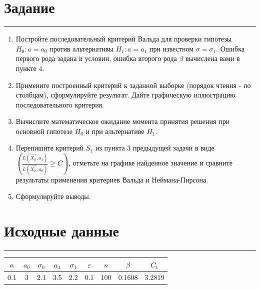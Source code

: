 \documentclass[a4paper, 14pt]{extarticle}
\begin{document}
\lstset{style=mystyle, extendedchars=\true}


\section*{Задание}\vspace{-20pt}\rule{\linewidth}{0.1mm}

\begin{enumerate}
    \item Постройте последовательный критерий Вальда для проверки гипотезы \( H_0: a = a_0 \) против альтернативы \( H_1: a = a_1 \) при известном \( \sigma = \sigma_1 \). Ошибка первого рода задана в условии, ошибка второго рода \( \beta \) вычислена вами в пункте 4.
    \item Примените построенный критерий к заданной выборке (порядок чтения - по столбцам), сформулируйте результат. Дайте графическую иллюстрацию последовательного критерия.
    \item Вычислите математическое ожидание момента принятия решения при основной гипотезе \( H_0 \) и при альтернативе \( H_1 \).
    \item Перепишите критерий \( S_1 \) из пункта 3 предыдущей задачи в виде \( \left( \frac{L(\vec{X_n}, a_1)}{L(\vec{X_n}, a_0)}  \geq C \right) \), отметьте на графике найденное значение и сравните результаты применения критериев Вальда и Неймана-Пирсона.
    \item Сформулируйте выводы.
\end{enumerate}

\section*{Исходные данные}\vspace{-20pt}\rule{\linewidth}{0.1mm}

\begin{center}
    \begin{tabular}{|c|c|c|c|c|c|c|c|c|}
        \hline
        $\alpha$ & $a_0$ & $\sigma_0$ & $a_1$ & $\sigma_1$ & $\varepsilon$ & $n$ & $\beta$ & $C_1$ \\
        \hline
        0.1      & 3      & 2.1       & 3.5   & 2.2        & 0.1           & 100 & 0.1608 & 3.2819 \\
        \hline
    \end{tabular}
\end{center}
\end{document}

